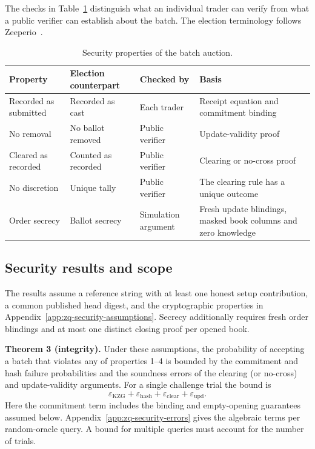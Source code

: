 The checks in Table~\ref{tab:zq-security-properties} distinguish what an individual trader can verify from what a public verifier can establish about the batch. The election terminology follows Zeeperio~\cite{MEC26}.

\begingroup
\small
\setlength{\tabcolsep}{3pt}
\begin{longtable}{@{}p{.20\linewidth}p{.20\linewidth}p{.18\linewidth}p{.33\linewidth}@{}}
\caption{Security properties of the batch auction.}\label{tab:zq-security-properties}\\
\toprule
Property & Election counterpart & Checked by & Basis \\
\midrule
\endhead
Recorded as submitted & Recorded as cast & Each trader & Receipt equation and commitment binding \\
No removal & No ballot removed & Public verifier & Update-validity proof \\
Cleared as recorded & Counted as recorded & Public verifier & Clearing or no-cross proof \\
No discretion & Unique tally & Public verifier & The clearing rule has a unique outcome \\
Order secrecy & Ballot secrecy & Simulation argument & Fresh update blindings, masked book columns and zero knowledge \\
\bottomrule
\end{longtable}
\endgroup

\subsection{Security results and scope}

The results assume a reference string with at least one honest setup contribution, a common published head digest, and the cryptographic properties in Appendix~\ref{app:zq-security-assumptions}. Secrecy additionally requires fresh order blindings and at most one distinct closing proof per opened book.

\textbf{Theorem 3 (integrity).} Under these assumptions, the probability of accepting a batch that violates any of properties 1--4 is bounded by the commitment and hash failure probabilities and the soundness errors of the clearing (or no-cross) and update-validity arguments. For a single challenge trial the bound is
\[
  \varepsilon_{\mathrm{KZG}}+\varepsilon_{\mathrm{hash}}
  +\varepsilon_{\mathrm{clear}}+\varepsilon_{\mathrm{upd}}.
\]
Here the commitment term includes the binding and empty-opening guarantees assumed below. Appendix~\ref{app:zq-security-errors} gives the algebraic terms per random-oracle query. A bound for multiple queries must account for the number of trials.

